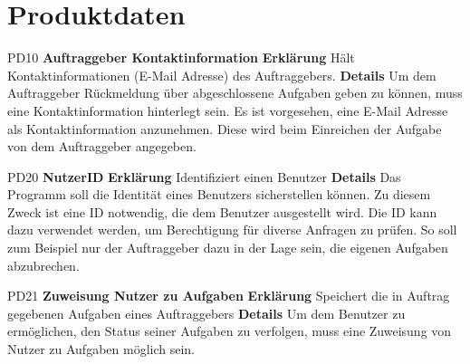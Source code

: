 \documentclass[a4paper,12pt]{article}
\begin{document}
\section{Produktdaten}
\begin{itemize}[nosep]
\leftskip=0.5cm

\begin{minipage}[t]{\linewidth}
\item[PD10] \textbf{Auftraggeber Kontaktinformation}
\subitem \textbf{Erklärung} Hält Kontaktinformationen (E-Mail Adresse) des Auftraggebers.
\subitem \textbf{Details} Um dem Auftraggeber Rückmeldung über abgeschlossene Aufgaben geben zu können, muss eine Kontaktinformation hinterlegt sein.\newline
Es ist vorgesehen, eine E-Mail Adresse als Kontaktinformation anzunehmen. Diese wird beim Einreichen der Aufgabe von dem Auftraggeber angegeben.
\end{minipage}
\vspace{20mm}

\begin{minipage}[t]{\linewidth}
\item[PD20] \textbf{NutzerID}
\subitem \textbf{Erklärung} Identifiziert einen Benutzer
\subitem \textbf{Details} Das Programm soll die Identität eines Benutzers sicherstellen können. Zu diesem Zweck ist eine ID notwendig, die dem Benutzer ausgestellt wird.\newline
Die ID kann dazu verwendet werden, um Berechtigung für diverse Anfragen zu prüfen. So soll zum Beispiel nur der Auftraggeber dazu in der Lage sein, die eigenen Aufgaben abzubrechen.
\end{minipage}
\vspace{20mm}

\begin{minipage}[t]{\linewidth}
\item[PD21] \textbf{Zuweisung Nutzer zu Aufgaben}
\subitem \textbf{Erklärung} Speichert die in Auftrag gegebenen Aufgaben eines Auftraggebers
\subitem \textbf{Details} Um dem Benutzer zu ermöglichen, den Status seiner Aufgaben zu verfolgen, muss eine Zuweisung von Nutzer zu Aufgaben möglich sein.
\end{minipage}
\vspace{20mm}


\end{itemize}
\end{document}
